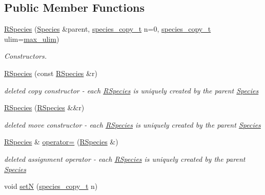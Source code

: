 \subsection*{Public Member Functions}
\begin{DoxyCompactItemize}
\item 
\hyperlink{classchem_1_1RSpecies_a66b426fdb13ec0e9ec61a96fadda465d}{R\-Species} (\hyperlink{classchem_1_1Species}{Species} \&parent, \hyperlink{common_8h_a3503f321fd36304ee274141275cca586}{species\-\_\-copy\-\_\-t} n=0, \hyperlink{common_8h_a3503f321fd36304ee274141275cca586}{species\-\_\-copy\-\_\-t} ulim=\hyperlink{common_8h_adaf831a0b61083f29adf8fc6e8edab35}{max\-\_\-ulim})
\begin{DoxyCompactList}\small\item\em Constructors. \end{DoxyCompactList}\item 
\hyperlink{classchem_1_1RSpecies_aed7fd68d286fab8190372a4dd98c14e3}{R\-Species} (const \hyperlink{classchem_1_1RSpecies}{R\-Species} \&r)
\begin{DoxyCompactList}\small\item\em deleted copy constructor -\/ each \hyperlink{classchem_1_1RSpecies}{R\-Species} is uniquely created by the parent \hyperlink{classchem_1_1Species}{Species} \end{DoxyCompactList}\item 
\hyperlink{classchem_1_1RSpecies_a06341eaeb5d6c30bf7812b08354b6b19}{R\-Species} (\hyperlink{classchem_1_1RSpecies}{R\-Species} \&\&r)
\begin{DoxyCompactList}\small\item\em deleted move constructor -\/ each \hyperlink{classchem_1_1RSpecies}{R\-Species} is uniquely created by the parent \hyperlink{classchem_1_1Species}{Species} \end{DoxyCompactList}\item 
\hyperlink{classchem_1_1RSpecies}{R\-Species} \& \hyperlink{classchem_1_1RSpecies_a2779fcf9c5103251aa87e7b466ba7752}{operator=} (\hyperlink{classchem_1_1RSpecies}{R\-Species} \&)
\begin{DoxyCompactList}\small\item\em deleted assignment operator -\/ each \hyperlink{classchem_1_1RSpecies}{R\-Species} is uniquely created by the parent \hyperlink{classchem_1_1Species}{Species} \end{DoxyCompactList}\item 
void \hyperlink{classchem_1_1RSpecies_a7939d5255e97d125821f657cadb48bc2}{set\-N} (\hyperlink{common_8h_a3503f321fd36304ee274141275cca586}{species\-\_\-copy\-\_\-t} n)

\end{DoxyCompactItemize}
